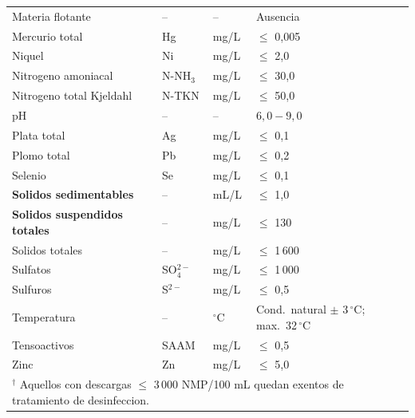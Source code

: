 \documentclass[12pt,a4paper]{article}
\begin{document}
\begin{longtable}{p{4.5cm}p{2.0cm}p{2.0cm}p{3.5cm}}
Materia flotante & -- & -- & Ausencia \\
Mercurio total & Hg & mg/L & $\leq$ 0,005 \\
Niquel & Ni & mg/L & $\leq$ 2,0 \\
Nitrogeno amoniacal & N-NH$_3$ & mg/L & $\leq$ 30,0 \\
Nitrogeno total Kjeldahl & N-TKN & mg/L & $\leq$ 50,0 \\
pH & -- & -- & $6,0 - 9,0$ \\
Plata total & Ag & mg/L & $\leq$ 0,1 \\
Plomo total & Pb & mg/L & $\leq$ 0,2 \\
Selenio & Se & mg/L & $\leq$ 0,1 \\
\textbf{Solidos sedimentables} & -- & mL/L & $\leq$ 1,0 \\
\textbf{Solidos suspendidos totales} & -- & mg/L & $\leq$ 130 \\
Solidos totales & -- & mg/L & $\leq$ 1\,600 \\
Sulfatos & SO$_4^{2-}$ & mg/L & $\leq$ 1\,000 \\
Sulfuros & S$^{2-}$ & mg/L & $\leq$ 0,5 \\
Temperatura & -- & $^\circ$C & Cond.\ natural $\pm$ 3\,$^\circ$C; max.\ 32\,$^\circ$C \\
Tensoactivos & SAAM & mg/L & $\leq$ 0,5 \\
Zinc & Zn & mg/L & $\leq$ 5,0 \\
\multicolumn{4}{l}{\scriptsize $^\dagger$ Aquellos con descargas $\leq$ 3\,000 NMP/100 mL quedan exentos de tratamiento de desinfeccion.}\\
\end{longtable}
\normalsize
\end{document}
